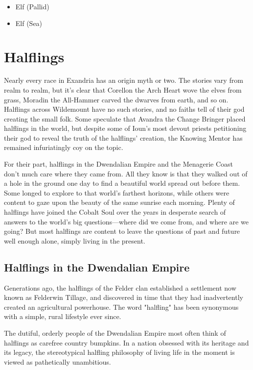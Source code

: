 \documentclass[10pt,a4paper,twoside,bg=print,twocolumn,openany,nodeprecatedcode]{dndbook}
\begin{document}
\begin{itemize}
\item Elf (Pallid)
\item Elf (Sea)
\end{itemize}

\section{Halflings}
Nearly every race in Exandria has an origin myth or two. The stories vary from realm to realm, but it's clear that Corellon the Arch Heart wove the elves from grass, Moradin the All-Hammer carved the dwarves from earth, and so on. Halflings across Wildemount have no such stories, and no faiths tell of their god creating the small folk. Some speculate that Avandra the Change Bringer placed halflings in the world, but despite some of Ioun's most devout priests petitioning their god to reveal the truth of the halflings' creation, the Knowing Mentor has remained infuriatingly coy on the topic.

For their part, halflings in the Dwendalian Empire and the Menagerie Coast don't much care where they came from. All they know is that they walked out of a hole in the ground one day to find a beautiful world spread out before them. Some longed to explore to that world's farthest horizons, while others were content to gaze upon the beauty of the same sunrise each morning. Plenty of halflings have joined the Cobalt Soul over the years in desperate search of answers to the world's big questions—where did we come from, and where are we going? But most halflings are content to leave the questions of past and future well enough alone, simply living in the present.

\subsection{Halflings in the Dwendalian Empire}
Generations ago, the halflings of the Felder clan established a settlement now known as Felderwin Tillage, and discovered in time that they had inadvertently created an agricultural powerhouse. The word "halfling" has been synonymous with a simple, rural lifestyle ever since.

The dutiful, orderly people of the Dwendalian Empire most often think of halflings as carefree country bumpkins. In a nation obsessed with its heritage and its legacy, the stereotypical halfling philosophy of living life in the moment is viewed as pathetically unambitious.
\end{document}
